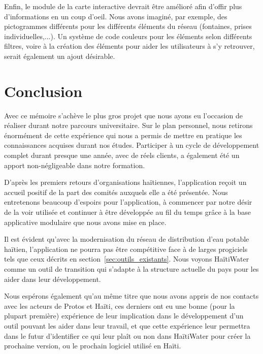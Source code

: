 \documentclass{EPL-master-thesis-covers-FR}
\begin{document}
			Enfin, le module de la carte interactive devrait être amélioré afin d'offir plus d'informations en un coup d'oeil. Nous avons imaginé, par exemple, des pictogrammes différents pour les différents éléments du réseau (fontaines, prises individuelles,...). Un système de code couleurs pour les éléments selon différents filtres, voire à la création des éléments pour aider les utilisateurs à s'y retrouver, serait également un ajout désirable.

	\chapter{Conclusion}

		Avec ce mémoire s'achève le plus gros projet que nous ayons eu l'occasion de réaliser durant notre parcours universitaire. Sur le plan personnel, nous retirons énormément de cette expérience qui nous a permis de mettre en pratique les connaissances acquises durant nos études. Participer à un cycle de développement complet durant presque une année, avec de réels clients, a également été un apport non-négligeable dans notre formation.

		D'après les premiers retours d'organisations haïtiennes, l'application reçoit un accueil positif de la part des comités auxquels elle a été présentée. Nous entretenons beaucoup d'espoirs pour l'application, à commencer par notre désir de la voir utilisée et continuer à être développée au fil du temps grâce à la base applicative modulaire que nous avons mise en place.

		Il est évident qu'avec la modernisation du réseau de distribution d'eau potable haïtien, l'application ne pourra pas être compétitive face à de larges progiciels tels que ceux décrits en section~\ref{sec:outils_existants}. Nous voyons HaïtiWater comme un outil de transition qui s'adapte à la structure actuelle du pays pour les aider dans leur développement.

		Nous espérons également qu'au même titre que nous avons appris de nos contacts avec les acteurs de Protos et Haïti, ces derniers ont eu une bonne (pour la plupart première) expérience de leur implication dans le développement d'un outil pouvant les aider dans leur travail, et que cette expérience leur permettra dans le futur d'identifier ce qui leur plaît ou non dans HaïtiWater pour créer la prochaine version, ou le prochain logiciel utilisé en Haïti.
\end{document}
